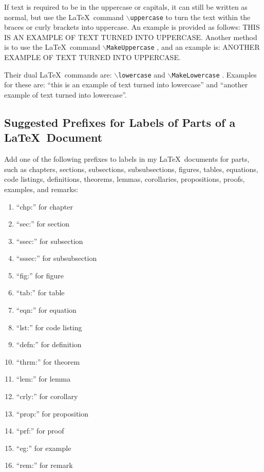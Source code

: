 \documentclass[letter,12pt]{article}
\begin{document}
If text is required to be in the uppercase or capitals, it can still be written as normal, but use the \LaTeX\ command {\tt $\backslash$uppercase} to turn the text within the braces or curly brackets into uppercase. An example is provided as follows: \uppercase{This is an Example of Text Turned into UpperCase}. Another method is to use the \LaTeX\ command {\tt $\backslash$MakeUppercase} \cite[\S Appendix G.1, pp. 512]{Kopka2004}, and an example is: \MakeUppercase{Another Example of Text Turned into UpperCase}.

Their dual \LaTeX\ commands are: {\tt $\backslash$lowercase} and {\tt $\backslash$MakeLowercase} \cite[\S Appendix G.1, pp. 512]{Kopka2004}. Examples for these are: ``\lowercase{This is an Example of Text Turned into LowerCase}'' and ``\MakeLowercase{Another Example of Text Turned into LowerCase}''.





\subsection{Suggested Prefixes for Labels of Parts of a \LaTeX\ Document}
\label{ssec:SuggestedPrefixesForLabelsOfPartsOfALaTeXDocument}



Add one of the following prefixes to labels in my \LaTeX\ documents for parts, such as chapters, sections, subsections, subsubsections, figures, tables, equations, code listings, definitions, theorems, lemmas, corollaries, propositions, proofs, examples, and remarks: \vspace{-0.3cm}
\begin{enumerate} \itemsep -4pt
\item ``chp:'' for chapter
\item ``sec:'' for section
\item ``ssec:'' for subsection
\item ``sssec:'' for subsubsection
\item ``fig:'' for figure
\item ``tab:'' for table
\item ``eqn:'' for equation
\item ``lst:'' for code listing
\item ``defn:'' for definition
\item ``thrm:'' for theorem
\item ``lem:'' for lemma
\item ``crly:'' for corollary
\item ``prop:'' for proposition
\item ``prf:'' for proof
\item ``eg:'' for example
\item ``rem:'' for remark
\end{enumerate}
\end{document}

